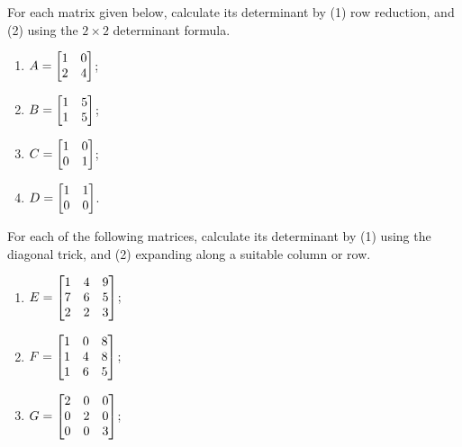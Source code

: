 \begin{exercises}
	\begin{problist}
		\prob For each matrix given below, calculate its determinant by (1) row reduction, and (2) using the $2\times 2$ determinant formula.
		\begin{enumerate}
			\item $A=\mat{1 & 0 \\ 2 & 4}$;

			\item $B=\mat{1 & 5 \\ 1 & 5}$;

			\item $C=\mat{1 & 0 \\ 0 & 1}$;

			\item $D=\mat{1 & 1 \\ 0 & 0}$.
		\end{enumerate}
		\prob For each of the following matrices, calculate its determinant by (1)
		using the diagonal trick, and (2) expanding along a suitable column or row.
		\begin{enumerate}
			\item $E=\mat{1 & 4 & 9 \\ 7 & 6 & 5 \\ 2 & 2 & 3}$;

			\item $F=\mat{1 & 0 & 8 \\ 1 & 4 & 8 \\ 1 & 6 & 5}$;

			\item $G=\mat{2 & 0 & 0 \\ 0 & 2 & 0 \\ 0 & 0 & 3}$;


\end{enumerate}
\end{problist}
\end{exercises}
